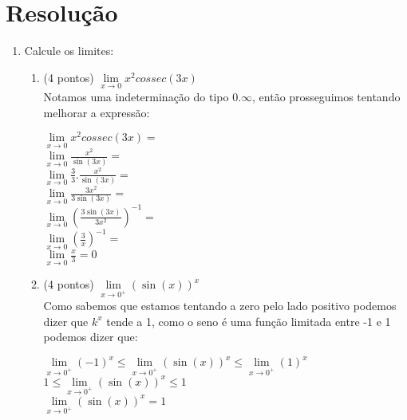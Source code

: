 \documentclass[12pt]{article}
\begin{document}
\part{Resolução}
\begin{enumerate}
	\item Calcule os limites:
	\begin{enumerate}
		\item (4 pontos) $ \lim\limits_{x \rightarrow 0}x^2 cossec(3x) $
		\\
		Notamos uma indeterminação do tipo $0.\infty$, então prosseguimos tentando melhorar a expressão:
		\begin{center}
			$ \lim\limits_{x \rightarrow 0}x^2 cossec(3x) =$ \\
			$ \lim\limits_{x \rightarrow 0}\frac{x^2}{\sin(3x)} =$\\
			$ \lim\limits_{x \rightarrow 0}\frac{3}{3} . \frac{x^2}{\sin(3x)} =$\\
			$ \lim\limits_{x \rightarrow 0}\frac{3x^2}{3 \sin(3x)} =$\\
			$ \lim\limits_{x \rightarrow 0}\left(  \frac{3 \sin(3x)}{3x^2} \right) ^{-1} =$\\
			$ \lim\limits_{x \rightarrow 0}\left(  \frac{3}{x} \right) ^{-1} =$\\
			$ \lim\limits_{x \rightarrow 0}\frac{x}{3}= 0$\\
		\end{center}
		
		\item (4 pontos) $ \lim\limits_{x \rightarrow 0^{+}} (\sin(x))^x $
		\\
		Como sabemos que estamos tentando a zero pelo lado positivo podemos dizer que $k^x$ tende a 1, como o seno é uma função limitada entre -1 e 1 podemos dizer que:
		\begin{center}
			$ \lim\limits_{x \rightarrow 0^{+}} (-1)^x \le  \lim\limits_{x \rightarrow 0^{+}} (\sin(x))^x \le \lim\limits_{x \rightarrow 0^{+}} (1)^x$\\
			$ 1 \le  \lim\limits_{x \rightarrow 0^{+}} (\sin(x))^x \le 1$\\
			$ \lim\limits_{x \rightarrow 0^{+}} (\sin(x))^x = 1$\\
		\end{center}
		

\end{enumerate}
\end{enumerate}
\end{document}
